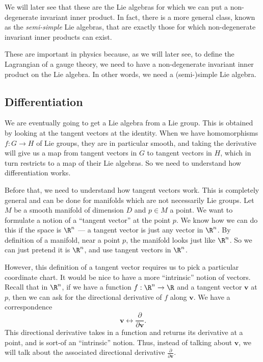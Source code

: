 \documentclass[a4paper]{article}
\begin{document}
We will later see that these are the Lie algebras for which we can put a non-degenerate invariant inner product. In fact, there is a more general class, known as the \emph{semi-simple} Lie algebras, that are exactly those for which non-degenerate invariant inner products can exist.

These are important in physics because, as we will later see, to define the Lagrangian of a gauge theory, we need to have a non-degenerate invariant inner product on the Lie algebra. In other words, we need a (semi-)simple Lie algebra.


\subsection{Differentiation}
We are eventually going to get a Lie algebra from a Lie group. This is obtained by looking at the tangent vectors at the identity. When we have homomorphisms $f: G \to H$ of Lie groups, they are in particular smooth, and taking the derivative will give us a map from tangent vectors in $G$ to tangent vectors in $H$, which in turn restricts to a map of their Lie algebras. So we need to understand how differentiation works.

Before that, we need to understand how tangent vectors work. This is completely general and can be done for manifolds which are not necessarily Lie groups. Let $M$ be a smooth manifold of dimension $D$ and $p \in M$ a point. We want to formulate a notion of a ``tangent vector'' at the point $p$. We know how we can do this if the space is $\R^n$ --- a tangent vector is just any vector in $\R^n$. By definition of a manifold, near a point $p$, the manifold looks just like $\R^n$. So we can just pretend it is $\R^n$, and use tangent vectors in $\R^n$.

However, this definition of a tangent vector requires us to pick a particular coordinate chart. It would be nice to have a more ``intrinsic'' notion of vectors. Recall that in $\R^n$, if we have a function $f: \R^n \to \R$ and a tangent vector $\mathbf{v}$ at $p$, then we can ask for the directional derivative of $f$ along $\mathbf{v}$. We have a correspondence
\[
  \mathbf{v} \longleftrightarrow \frac{\partial}{\partial \mathbf{v}}.
\]
This directional derivative takes in a function and returns its derivative at a point, and is sort-of an ``intrinsic'' notion. Thus, instead of talking about $\mathbf{v}$, we will talk about the associated directional derivative $\frac{\partial}{\partial \mathbf{v}}$.
\end{document}
